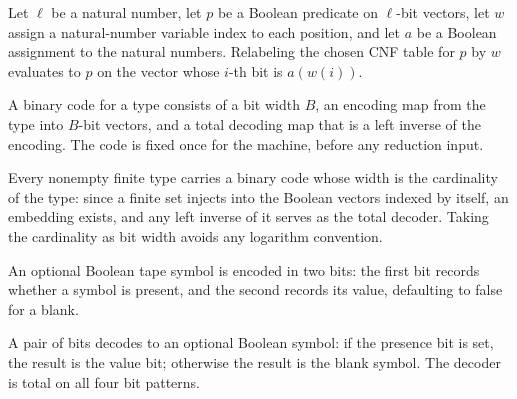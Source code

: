 \begin{lemma}
\label{Complexity.clTemplate_eval}
\leanok
{}
Let $\ell$ be a natural number, let $p$ be a Boolean predicate on $\ell$-bit vectors,
let $w$ assign a natural-number variable index to each position, and let $a$ be a
Boolean assignment to the natural numbers. Relabeling the chosen CNF table for $p$ by
$w$ evaluates to $p$ on the vector whose $i$-th bit is $a(w(i))$.
\end{lemma}

\begin{definition}
\label{Complexity.CLFieldCode}
\leanok
A binary code for a type consists of a bit width $B$, an encoding map from the type into $B$-bit vectors, and a total decoding map that is a left inverse of the encoding. The code is fixed once for the machine, before any reduction input.
\end{definition}

\begin{definition}
\label{Complexity.clFieldCode}
\leanok
{}
Every nonempty finite type carries a binary code whose width is the cardinality of the type: since a finite set injects into the Boolean vectors indexed by itself, an embedding exists, and any left inverse of it serves as the total decoder. Taking the cardinality as bit width avoids any logarithm convention.
\end{definition}

\begin{definition}
\label{Complexity.clSymbolCode}
\leanok
An optional Boolean tape symbol is encoded in two bits: the first bit records whether a symbol is present, and the second records its value, defaulting to false for a blank.
\end{definition}

\begin{definition}
\label{Complexity.clSymbolDecode}
\leanok
A pair of bits decodes to an optional Boolean symbol: if the presence bit is set, the result is the value bit; otherwise the result is the blank symbol. The decoder is total on all four bit patterns.
\end{definition}

